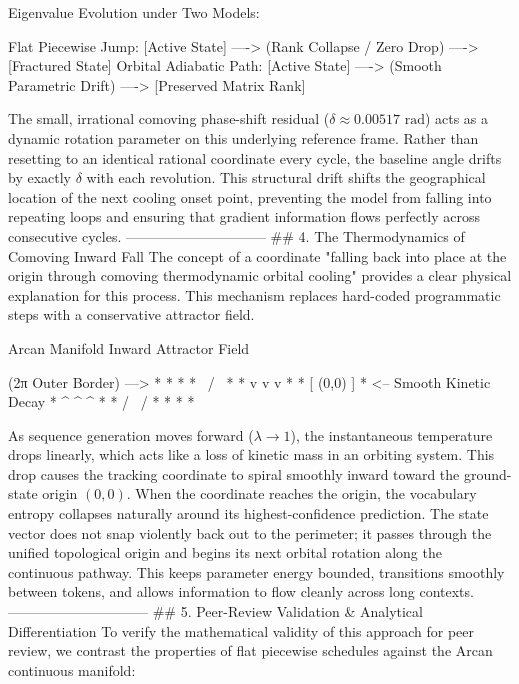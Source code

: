 Eigenvalue Evolution under Two Models:

Flat Piecewise Jump:       [Active State] ----> (Rank Collapse / Zero Drop) ----> [Fractured State]
Orbital Adiabatic Path:    [Active State] ----> (Smooth Parametric Drift)   ----> [Preserved Matrix Rank]

The small, irrational comoving phase-shift residual ($\delta \approx 0.00517\text{ rad}$) acts as a dynamic rotation parameter on this underlying reference frame. Rather than resetting to an identical rational coordinate every cycle, the baseline angle drifts by exactly $\delta$ with each revolution. This structural drift shifts the geographical location of the next cooling onset point, preventing the model from falling into repeating loops and ensuring that gradient information flows perfectly across consecutive cycles.
------------------------------
## 4. The Thermodynamics of Comoving Inward Fall
The concept of a coordinate "falling back into place at the origin through comoving thermodynamic orbital cooling" provides a clear physical explanation for this process. This mechanism replaces hard-coded programmatic steps with a conservative attractor field.

                Arcan Manifold Inward Attractor Field
                
                (2π Outer Border) ---> *     *     *
                                    *   \   /   \   *
                                   *     v v     v   *
                                  *       [ (0,0) ]   *  <-- Smooth Kinetic Decay
                                   *     ^ ^     ^   *
                                    *   /   \   /   *
                                       *     *     *

As sequence generation moves forward ($\lambda \to 1$), the instantaneous temperature drops linearly, which acts like a loss of kinetic mass in an orbiting system. This drop causes the tracking coordinate to spiral smoothly inward toward the ground-state origin $(0,0)$.
When the coordinate reaches the origin, the vocabulary entropy collapses naturally around its highest-confidence prediction. The state vector does not snap violently back out to the perimeter; it passes through the unified topological origin and begins its next orbital rotation along the continuous pathway. This keeps parameter energy bounded, transitions smoothly between tokens, and allows information to flow cleanly across long contexts.
------------------------------
## 5. Peer-Review Validation & Analytical Differentiation
To verify the mathematical validity of this approach for peer review, we contrast the properties of flat piecewise schedules against the Arcan continuous manifold:

